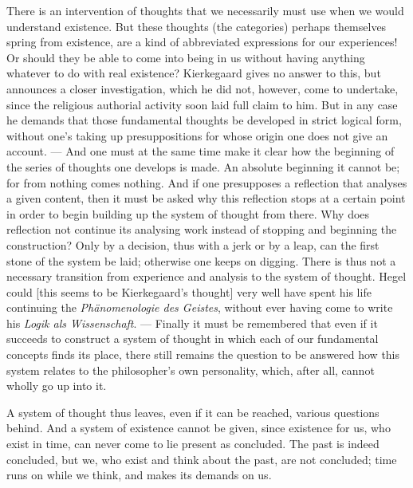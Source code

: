 \documentclass[12pt,a4paper]{book}
\newcommand{\opage}[1]{\marginnote{\footnotesize\textit{[#1]}}}
\begin{document}
There is an intervention of thoughts that we necessarily must use when we would understand
existence. But these thoughts (the categories) perhaps themselves spring from existence, are
a kind of abbreviated expressions for our experiences! Or should they be able to come into
being in us without having anything whatever to do with real existence? Kierkegaard gives no
answer to this, but announces a closer investigation, which he did not, however, come to
undertake, since the religious authorial activity soon laid full claim to him. But in any
case he demands that those fundamental thoughts be developed in strict logical form, without
one's taking up presuppositions for whose origin one does not give an account. --- And one
must at the same time make it clear how the beginning of the series of thoughts one develops
is made. An absolute beginning it cannot be; for \opage{152}from nothing comes nothing. And if one
presupposes a reflection that analyses a given content, then it must be asked why this
reflection stops at a certain point in order to begin building up the system of thought from
there. Why does reflection not continue its analysing work instead of stopping and beginning
the construction? Only by a decision, thus with a jerk or by a leap, can the first stone of
the system be laid; otherwise one keeps on digging. There is thus not a necessary transition
from experience and analysis to the system of thought. Hegel could [this seems to be
Kierkegaard's thought] very well have spent his life continuing the \emph{Phänomenologie des
Geistes}, without ever having come to write his \emph{Logik als Wissenschaft}. --- Finally
it must be remembered that even if it succeeds to construct a system of thought in which each
of our fundamental concepts finds its place, there still remains the question to be answered
how this system relates to the philosopher's own personality, which, after all, cannot
wholly go up into it.

A system of thought thus leaves, even if it can be reached, various questions behind. And a
system of existence cannot be given, since existence for us, who exist in time, can never
come to lie present as concluded. The past is indeed concluded, but we, who exist and think
about the past, are not concluded; time runs on while we think, and makes its demands on us.
\end{document}
